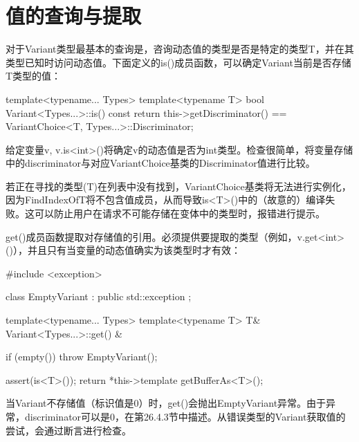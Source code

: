 \section{值的查询与提取}
对于Variant类型最基本的查询是，咨询动态值的类型是否是特定的类型T，并在其类型已知时访问动态值。下面定义的is()成员函数，可以确定Variant当前是否存储T类型的值：

\begin{cpp}
template<typename... Types>
template<typename T>
bool Variant<Types...>::is() const {
	return this->getDiscriminator() ==
	VariantChoice<T, Types...>::Discriminator;
}
\end{cpp}

给定变量v, v.is<int>()将确定v的动态值是否为int类型。检查很简单，将变量存储中的discriminator与对应VariantChoice基类的Discriminator值进行比较。

若正在寻找的类型(T)在列表中没有找到，VariantChoice基类将无法进行实例化，因为FindIndexOfT将不包含值成员，从而导致is<T>()中的（故意的）编译失败。这可以防止用户在请求不可能存储在变体中的类型时，报错进行提示。

get()成员函数提取对存储值的引用。必须提供要提取的类型（例如，v.get<int>()），并且只有当变量的动态值确实为该类型时才有效：

\begin{cpp}
#include <exception>

class EmptyVariant : public std::exception {};

template<typename... Types>
template<typename T>
T& Variant<Types...>::get() & {
	if (empty()) {
		throw EmptyVariant();
	}

	assert(is<T>());
	return *this->template getBufferAs<T>();
}
\end{cpp}

当Variant不存储值（标识值是0）时，get()会抛出EmptyVariant异常。由于异常，discriminator可以是0，在第26.4.3节中描述。从错误类型的Variant获取值的尝试，会通过断言进行检查。













































